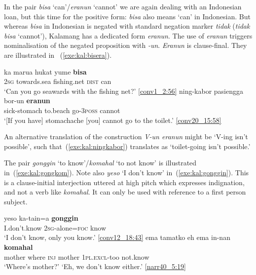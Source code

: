 \documentclass[output=paper,colorlinks,citecolor=brown,draft]{langscibook}
\begin{document}
In the pair \textit{bisa} `can'/\textit{eranun} `cannot' we are again dealing with an Indonesian loan, but this time for the positive form: \textit{bisa} also means `can' in Indonesian. But whereas \textit{bisa} in Indonesian is negated with standard negation marker \textit{tidak} (\textit{tidak bisa} `cannot'), Kalamang has a dedicated form \textit{eranun}. The use of \textit{eranun} triggers nominalisation of the negated proposition with \textit{-un}. \textit{Eranun} is clause-final. They are illustrated in ~(\ref{exe:kal:bisera}).

\ea \label{exe:kal:bisera}
\ea \label{exe:kal:bisa}
\gll ka marua hukat yume \textbf{bisa}\\
\textsc{2sg} towards.sea fishing.net \textsc{dist} can\\
\glt `Can you go seawards with the fishing net?' {\href{http://hdl.handle.net/10050/00-0000-0000-0004-1BCB-5}{[conv1\_2:56]}}
\ex	\label{exe:kal:ningkabor}
\gll ning-kabor pasiengga bor-un \textbf{eranun}\\
sick-stomach to.beach go-\textsc{3poss} cannot\\
\glt 	`[If you have] stomachache [you] cannot go to the toilet.' {\href{http://hdl.handle.net/10050/00-0000-0000-0004-1BCA-4}{[conv20\_15:58]}}
\z \z

An alternative translation of the construction \textit{V-un eranun} might be `V-ing isn't possible', such that~(\ref{exe:kal:ningkabor}) translates as `toilet-going isn't possible.'

The pair \textit{gonggin} `to know'/\textit{komahal} `to not know' is illustrated in~(\ref{exe:kal:gongkom}). Note also \textit{yeso} `I don't know' in~(\ref{exe:kal:gonggin}). This is a clause-initial interjection uttered at high pitch which expresses indignation, and not a verb like \textit{komahal}. It can only be used with reference to a first person subject.

\ea \label{exe:kal:gongkom}
\ea \label{exe:kal:gonggin}
\gll yeso ka-tain=a \textbf{gonggin}\\
I.don't.know \textsc{2sg}-alone=\textsc{foc} know\\
\glt `I don't know, only you know.' {\href{http://hdl.handle.net/10050/00-0000-0000-0004-1BBD-5}{[conv12\_18:43]}}
\ex \label{exe:kal:komahal}
\gll ema tamatko eh ema in-nan \textbf{komahal}\\
mother where \textsc{inj} mother \textsc{1pl.excl}-too not.know\\
\glt `Where's mother?' `Eh, we don't know either.' {\href{http://hdl.handle.net/10050/00-0000-0000-0004-1BBB-2}{[narr40\_5:19]}}
\z \z
\end{document}

